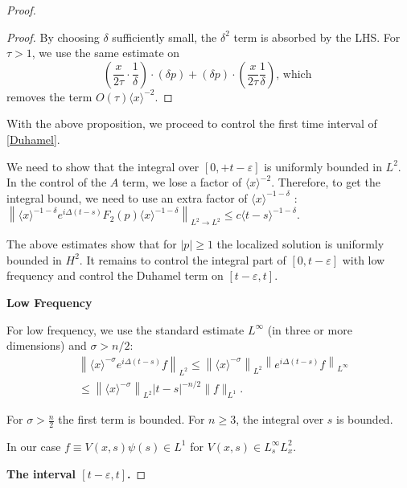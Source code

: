 \documentclass[11pt]{article}
\begin{document}
\begin{proof}
\begin{proof}
By choosing $\delta$ sufficiently small, the $\delta^{2}$ term is absorbed by the LHS.
For $\tau>1$, we use the same estimate on
$$
\left(\frac{x}{2 \tau} \cdot \frac{1}{\delta}\right) \cdot(\delta p)+(\delta p) \cdot\left(\frac{x}{2 \tau} \frac{1}{\delta}\right) \text {, which }
$$
removes the term $O(\tau)\langle x\rangle^{-2}$.
\end{proof}
With the above proposition, we proceed to control the first time interval of \eqref{Duhamel}.


We need to show that the integral over $[0,+t-\varepsilon]$ is uniformly bounded in $L^{2}$.
In the control of the $A$ term, we lose a factor of $\langle x\rangle^{-2}$.
Therefore, to get the integral bound, we need to use an extra factor of $\langle x\rangle^{-1-\delta}$ :
$\left\|\langle x\rangle^{-1-\delta} e^{i \Delta(t-s)} F_{2}(p)\langle x\rangle^{-1-\delta}\right\|_{L^{2} \rightarrow L^{2}} \leq c\langle t-s\rangle^{-1-\delta}.$




The above estimates show that for $|p| \geqslant 1$ the localized solution is uniformly bounded in $H^{2}$.
It remains to control the integral part of $[0, t-\varepsilon]$ with low frequency and control
the Duhamel term on $[t-\varepsilon, t]$.

{\bf Low Frequency}


For low frequency, we use the standard estimate $L^{\infty}$ (in three or more dimensions) and $\sigma >n/2:$
$$
\begin{aligned}
& \left\|\langle x\rangle^{-\sigma} e^{i \Delta(t-s)} f\right\|_{L^{2}} \leqslant\left\|\langle x\rangle^{-\sigma}\right\|_{L^{2}}\left\|e^{i \Delta(t-s)} f\right\|_{L^{\infty}} \\
& \leqslant\left\|\langle x\rangle^{-\sigma}\right\|_{L^{2}}|t-s|^{-n / 2}\|f\|_{L^{1}} .
\end{aligned}
$$

For $\sigma>\frac{n}{2}$ the first term is bounded.
For $n \geqslant 3$, the integral over $s$ is bounded.


In our case $f \equiv V(x, s) \psi(s) \in L^{1}$
for $V(x, s) \in L_{s}^{\infty} L_{x}^{2}$.
\newline
\newline


{\bf The interval $[t-\varepsilon, t]$.}



\end{proof}
\end{document}

